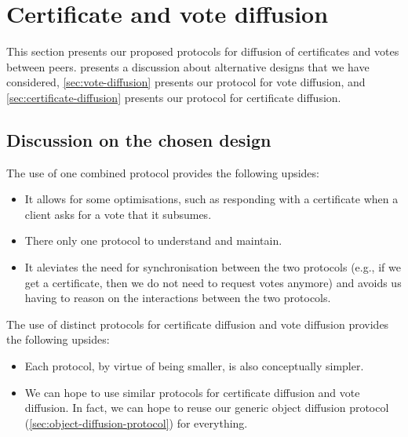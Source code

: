 \section{Certificate and vote diffusion}%
\label{sec:certificate-vote-diffusion}

This section presents our proposed protocols for diffusion of certificates and votes between peers.
 presents a discussion about alternative designs that we have considered, \cref{sec:vote-diffusion} presents our protocol for vote diffusion, and \cref{sec:certificate-diffusion} presents our protocol for certificate diffusion.

\subsection{Discussion on the chosen design}%
\label{sec:cert-vote-diff-discussion}


The use of one combined protocol provides the following upsides:
%
\begin{itemize}
\item
  It allows for some optimisations, such as responding with a certificate when a client asks for a vote that it subsumes.

\item
  There only one protocol to understand and maintain.

\item
  It aleviates the need for synchronisation between the two protocols (e.g., if we get a certificate, then we do not need to request votes anymore) and avoids us having to reason on the interactions between the two protocols.
\end{itemize}

The use of distinct protocols for certificate diffusion and vote diffusion provides the following upsides:

\begin{itemize}
\item
  Each protocol, by virtue of being smaller, is also conceptually simpler.

\item
  We can hope to use similar protocols for certificate diffusion and vote diffusion.
  In fact, we can hope to reuse our generic object diffusion protocol (\cref{sec:object-diffusion-protocol}) for everything.
\end{itemize}

